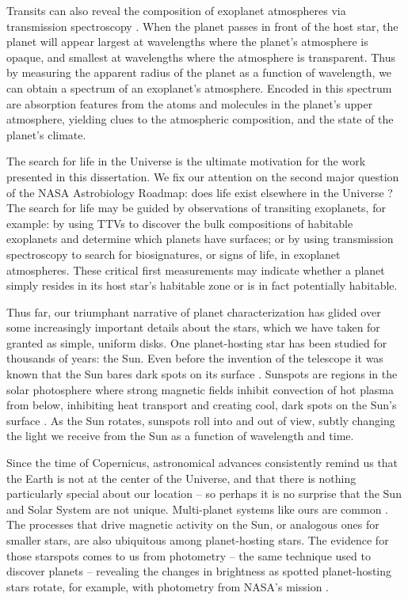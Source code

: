 Transits can also reveal the composition of exoplanet atmospheres via transmission spectroscopy \citep{Seager2000}. When the planet passes in front of the host star, the planet will appear largest at wavelengths where the planet's atmosphere is opaque, and smallest at wavelengths where the atmosphere is transparent. Thus by measuring the apparent radius of the planet as a function of wavelength, we can obtain a spectrum of an exoplanet's atmosphere. Encoded in this spectrum are absorption features from the atoms and molecules in the planet's upper atmosphere, yielding clues to the atmospheric composition, and the state of the planet's climate. 

The search for life in the Universe is the ultimate motivation for the work presented in this dissertation. We fix our  attention on the second major question of the NASA Astrobiology Roadmap: does life exist elsewhere in the Universe \citep{DesMarais2008}? The search for life may be guided by observations of transiting exoplanets, for example: by using TTVs to discover the bulk compositions of habitable exoplanets and determine which planets have surfaces; or by using transmission spectroscopy to search for biosignatures, or signs of life, in exoplanet atmospheres. These critical first measurements may indicate whether a planet simply resides in its host star's habitable zone or is in fact potentially habitable. 

Thus far, our triumphant narrative of planet characterization has glided over some increasingly important details about the stars, which we have taken for granted as simple, uniform disks. One planet-hosting star has been studied for thousands of years: the Sun. Even before the invention of the telescope it was known that the Sun bares dark spots on its surface \citep{Hayakawa2017}. Sunspots are regions in the solar photosphere where strong magnetic fields inhibit convection of hot plasma from below, inhibiting heat transport and creating cool, dark spots on the Sun's surface \citep{Solanki2003}. As the Sun rotates, sunspots roll into and out of view, subtly changing the light we receive from the Sun as a function of wavelength and time.

Since the time of Copernicus, astronomical advances consistently remind us that the Earth is not at the center of the Universe, and that there is nothing particularly special about our location \citep{Copernicus1543} -- so perhaps it is no surprise that the Sun and Solar System are not unique. Multi-planet systems like ours are common \citep{Dressing2013,Burke2015,Coughlin2016}. The processes that drive magnetic activity on the Sun, or analogous ones for smaller stars, are also ubiquitous among planet-hosting stars. The evidence for those starspots comes to us from photometry -- the same technique used to discover planets -- revealing the changes in brightness as spotted planet-hosting stars rotate, for example, with photometry from NASA's \kepler mission \citep{Walkowicz2013,McQuillan2013,Giles2017}.  

